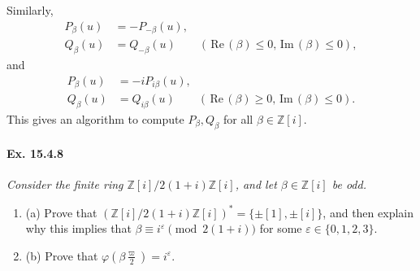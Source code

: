 \documentclass[11pt,a4paper]{article}
\newcommand{\be} {\begin{enumerate}}
\newcommand{\ee} {\end{enumerate}}
\newcommand{\Z}{\mathbb{Z}}
\newcommand{\re}{\,\mathrm{Re}\,}
\newcommand{\im}{\,\mathrm{Im}\,}
\begin{document}
Similarly,
\begin{align*}
P_\beta(u) &=  - P_{-\beta}(u),\\
Q_\beta(u) &= Q_{- \beta}(u) \qquad (\re(\beta)\leq 0, \im(\beta)\leq 0),
\end{align*}
and
\begin{align*}
P_\beta(u) &=  - iP_{i \beta}(u),\\
Q_\beta(u) &= Q_{i\beta}(u) \qquad (\re(\beta)\geq 0, \im(\beta)\leq 0).
\end{align*}
This gives an algorithm to compute $P_\beta, Q_\beta$ for all $\beta \in \Z[i]$.

\paragraph{Ex. 15.4.8}{\it Consider the finite ring $\Z[i]/2(1+i)\Z[i]$, and let $\beta \in \Z[i]$ be odd.
\be
\item[(a)] Prove that $\left(\Z[i]/2(1+i)\Z[i]\right)^*= \{\pm[1],\pm[i]\}$, and then explain why this implies that $\beta \equiv i^\varepsilon \pmod {2(1+i)}$ for some $\varepsilon \in \{0,1,2,3\}$.
\item[(b)] Prove that $\varphi\left(\beta \frac{\varpi}{2} \right) = i ^\varepsilon$.
\ee
}
\end{document}

